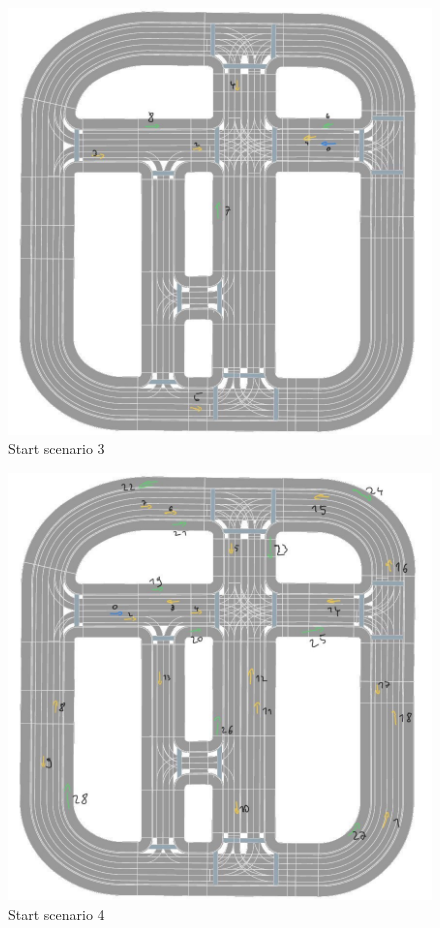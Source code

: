 \begin{figure}[ht] 
	\label{figure:appednix:start_scenario_3}
	\includegraphics[width=1\linewidth]{simulations/start_scenarios/scenario_v4}
	\caption{Start scenario 3}
\end{figure}

\begin{figure}[ht] 
	\label{figure:appednix:start_scenario_4}
	\includegraphics[width=1\linewidth]{simulations/start_scenarios/scenario_v5}
	\caption{Start scenario 4}
\end{figure}


